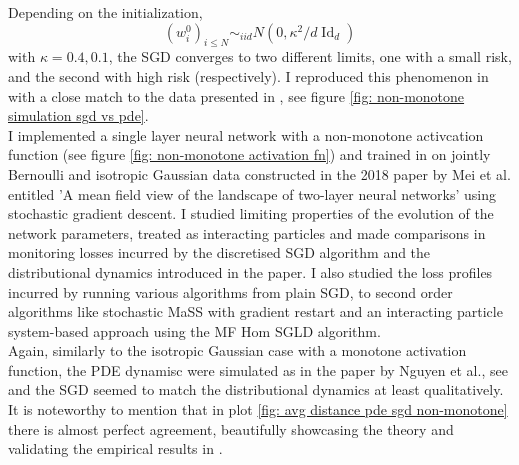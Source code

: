 \documentclass{article}
\theoremstyle{mystyle}
\DeclareMathOperator{\Id}{Id}
\begin{document}
\noindent Depending on the initialization,
\begin{equation}\label{eq: initialisation non-mon}
(w^{0}_{i})_{i\leq N}\sim_{iid} N(0, \kappa^{2}/d\Id_{d})
\end{equation}
with $ \kappa = 0.4, 0.1$, the SGD converges to two different limits, one with a small risk,
and the second with high risk (respectively). I reproduced this phenomenon in with a close match to the data presented in \cite{Mei_2018}, see figure \ref{fig: non-monotone simulation sgd vs pde}.\\

I implemented a single layer neural network with a non-monotone activcation function (see figure \ref{fig: non-monotone activation fn}) and trained in on jointly Bernoulli and isotropic Gaussian data constructed in the 2018 paper by Mei et al. entitled 'A mean field view of the landscape of two-layer neural networks' using stochastic gradient descent. I studied limiting properties of the evolution of the network parameters, treated as interacting particles and made comparisons in monitoring losses incurred by the discretised SGD algorithm and the distributional dynamics introduced in the paper. I also studied the loss profiles incurred by running various algorithms from plain SGD, to second order algorithms like stochastic MaSS with gradient restart and an interacting particle system-based approach using the MF Hom SGLD algorithm.\\ 

Again, similarly to the isotropic Gaussian case with a monotone activation function, the PDE dynamisc were simulated as in the paper by Nguyen et al., see \cite[p. 99]{Mei_2018} and the SGD seemed to match the distributional dynamics at least qualitatively. It is noteworthy to mention that in plot \ref{fig: avg distance pde sgd non-monotone} there is almost perfect agreement, beautifully showcasing the theory and validating the empirical results in \cite{Mei_2018}.
\end{document}
